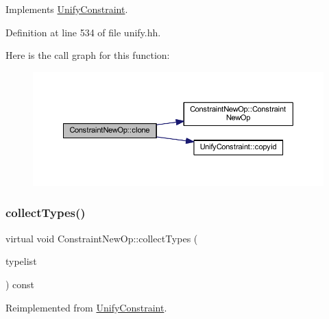 Implements \mbox{\hyperlink{class_unify_constraint_a4f068343932637d355644bb21559aa12}{Unify\+Constraint}}.



Definition at line 534 of file unify.\+hh.

Here is the call graph for this function\+:
\nopagebreak
\begin{figure}[H]
\begin{center}
\leavevmode
\includegraphics[width=350pt]{class_constraint_new_op_a5a9a1b594f9843f8365dfaaaa836675e_cgraph}
\end{center}
\end{figure}
\mbox{\label{class_constraint_new_op_a00605633396f06a8eef9493beb5d831e}} 
\subsubsection{\texorpdfstring{collectTypes()}{collectTypes()}}
{\footnotesize\ttfamily virtual void Constraint\+New\+Op\+::collect\+Types (\begin{DoxyParamCaption}\item[{vector$<$ \mbox{\hyperlink{class_unify_datatype}{Unify\+Datatype}} $>$ \&}]{typelist }\end{DoxyParamCaption}) const\hspace{0.3cm}{\ttfamily [virtual]}}



Reimplemented from \mbox{\hyperlink{class_unify_constraint_acb83b6bea3b21e13054e72ac9cfaba0f}{Unify\+Constraint}}.

\mbox{\label{class_constraint_new_op_aa1984f7dcd80598f9c39a9ea6a28b29d}} 
